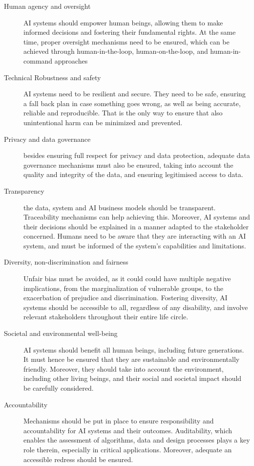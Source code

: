 \begin{description}
    \item[Human agency and oversight] AI systems should empower human beings, allowing them to make informed decisions and fostering their fundamental rights. At the same time, proper oversight mechanisms need to be ensured, which can be achieved through human-in-the-loop, human-on-the-loop, and human-in-command approaches
    \item[Technical Robustness and safety] AI systems need to be resilient and secure. They need to be safe, ensuring a fall back plan in case something goes wrong, as well as being accurate, reliable and reproducible. That is the only way to ensure that also unintentional harm can be minimized and prevented.
    \item[Privacy and data governance] besides ensuring full respect for privacy and data protection, adequate data governance mechanisms must also be ensured, taking into account the quality and integrity of the data, and ensuring legitimised access to data.
    \item[Transparency] the data, system and AI business models should be transparent. Traceability mechanisms can help achieving this. Moreover, AI systems and their decisions should be explained in a manner adapted to the stakeholder concerned. Humans need to be aware that they are interacting with an AI system, and must be informed of the system’s capabilities and limitations.
    \item[Diversity, non-discrimination and fairness] Unfair bias must be avoided, as it could could have multiple negative implications, from the marginalization of vulnerable groups, to the exacerbation of prejudice and discrimination. Fostering diversity, AI systems should be accessible to all, regardless of any disability, and involve relevant stakeholders throughout their entire life circle.
    \item[Societal and environmental well-being] AI systems should benefit all human beings, including future generations. It must hence be ensured that they are sustainable and environmentally friendly. Moreover, they should take into account the environment, including other living beings, and their social and societal impact should be carefully considered. 
    \item[Accountability] Mechanisms should be put in place to ensure responsibility and accountability for AI systems and their outcomes. Auditability, which enables the assessment of algorithms, data and design processes plays a key role therein, especially in critical applications. Moreover, adequate an accessible redress should be ensured.
\end{description}


